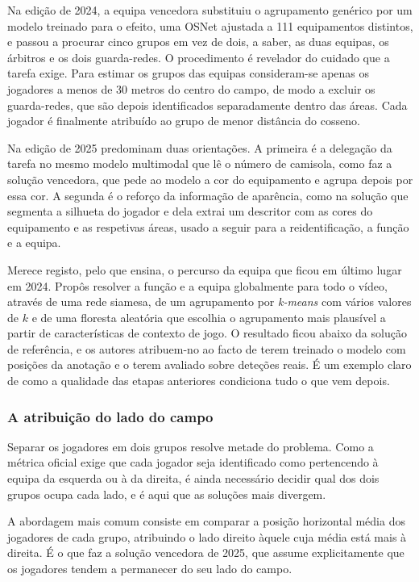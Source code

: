 Na edição de 2024, a equipa vencedora substituiu o agrupamento genérico por um modelo
treinado para o efeito, uma OSNet ajustada a 111 equipamentos distintos, e passou a
procurar cinco grupos em vez de dois, a saber, as duas equipas, os árbitros e os dois
guarda-redes. O procedimento é revelador do cuidado que a tarefa exige. Para estimar os
grupos das equipas consideram-se apenas os jogadores a menos de 30 metros do centro do
campo, de modo a excluir os guarda-redes, que são depois identificados separadamente
dentro das áreas. Cada jogador é finalmente atribuído ao grupo de menor distância do
cosseno.

Na edição de 2025 predominam duas orientações. A primeira é a delegação da tarefa no
mesmo modelo multimodal que lê o número de camisola, como faz a solução vencedora, que
pede ao modelo a cor do equipamento e agrupa depois por essa cor. A segunda é o reforço
da informação de aparência, como na solução que segmenta a silhueta do jogador e dela
extrai um descritor com as cores do equipamento e as respetivas áreas, usado a seguir
para a reidentificação, a função e a equipa.

Merece registo, pelo que ensina, o percurso da equipa que ficou em último lugar em 2024.
Propôs resolver a função e a equipa globalmente para todo o vídeo, através de uma rede
siamesa, de um agrupamento por \emph{k-means} com vários valores de $k$ e de uma floresta
aleatória que escolhia o agrupamento mais plausível a partir de características de
contexto de jogo. O resultado ficou abaixo da solução de referência, e os autores
atribuem-no ao facto de terem treinado o modelo com posições da anotação e o terem
avaliado sobre deteções reais. É um exemplo claro de como a qualidade das etapas
anteriores condiciona tudo o que vem depois.

\subsubsection*{A atribuição do lado do campo}

Separar os jogadores em dois grupos resolve metade do problema. Como a métrica oficial
exige que cada jogador seja identificado como pertencendo à equipa da esquerda ou à da
direita, é ainda necessário decidir qual dos dois grupos ocupa cada lado, e é aqui que
as soluções mais divergem.

A abordagem mais comum consiste em comparar a posição horizontal média dos jogadores de
cada grupo, atribuindo o lado direito àquele cuja média está mais à direita. É o que faz
a solução vencedora de 2025, que assume explicitamente que os jogadores tendem a
permanecer do seu lado do campo.

